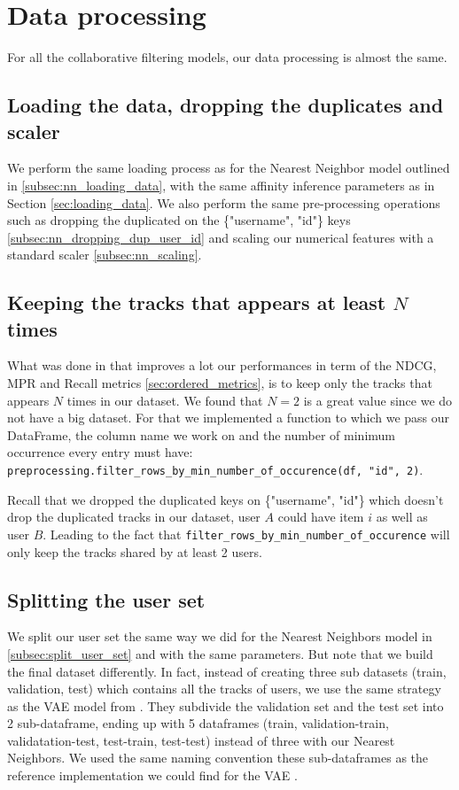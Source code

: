 \section{Data processing}
For all the collaborative filtering models, our data processing is almost the same.

\subsection{Loading the data, dropping the duplicates and scaler}
We perform the same loading process as for the Nearest Neighbor model outlined in \ref{subsec:nn_loading_data}, with the same affinity inference parameters as in Section \ref{sec:loading_data}. We also perform the same pre-processing operations such as dropping the duplicated on the \{"username", "id"\} keys \ref{subsec:nn_dropping_dup_user_id} and scaling our numerical features with a standard scaler \ref{subsec:nn_scaling}.

\subsection{Keeping the tracks that appears at least $N$ times}
What was done in \cite{liang2018variational} that improves a lot our performances in term of the NDCG, MPR and Recall metrics \ref{sec:ordered_metrics}, is to keep only the tracks that appears $N$ times in our dataset. We found that $N = 2$ is a great value since we do not have a big dataset. For that we implemented a function to which we pass our DataFrame, the column name we work on and the number of minimum occurrence every entry must have:
\texttt{preprocessing.filter\_rows\_by\_min\_number\_of\_occurence(df, "id", 2)}.

Recall that we dropped the duplicated keys on \{"username", "id"\} which doesn't drop the duplicated tracks in our dataset, user $A$ could have item $i$ as well as user $B$. Leading to the fact that \texttt{filter\_rows\_by\_min\_number\_of\_occurence} will only keep the tracks shared by at least 2 users.

\subsection{Splitting the user set}
We split our user set the same way we did for the Nearest Neighbors model in \ref{subsec:split_user_set} and with the same parameters. But note that we build the final dataset differently. In fact, instead of creating three sub datasets (train, validation, test) which contains all the tracks of users, we use the same strategy as the VAE model from \cite{liang2018variational}. They subdivide the validation set and the test set into 2 sub-dataframe, ending up with 5 dataframes (train, validation-train, validatation-test, test-train, test-test) instead of three with our Nearest Neighbors. We used the same naming convention these sub-dataframes as the reference implementation we could find for the VAE \cite{vae-cf} \cite{vae-cf-pytorch}.

